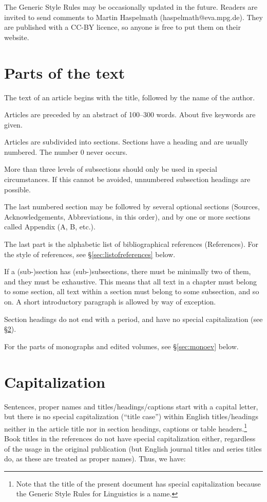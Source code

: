 \documentclass[a4paper]{article}
\newcommand{\gsrex}[1]{{\color{blue}#1}}
\newcommand{\sectref}[1]{\S\ref{#1}}
\begin{document}
The Generic Style Rules may be occasionally updated in the
future. Readers are invited to send comments to Martin Haspelmath
(haspelmath@eva.mpg.de). They are published with a CC-BY licence, so
anyone is free to put them on their website.

\section{Parts of the text}\label{sec:parts}

The text of an article begins with the title, followed by the name of
the author. 

Articles are preceded by an abstract of 100--300 words. About five keywords are given. 

Articles are subdivided into sections.
Sections have a heading and are usually numbered. The number 0 never
occurs. 

More than three levels of subsections should only be used in
special circumstances. If this cannot be avoided, unnumbered subsection
headings are possible. 

The last numbered section may be followed by
several optional sections (\gsrex{Sources},
\gsrex{Acknowledgements},
\gsrex{Abbreviations},
in this order), and by one or more sections called \gsrex{Appendix} (A, B, etc.).


The last part is the alphabetic list of bibliographical references
(\gsrex{References}). For the style of references, see \sectref{sec:listofreferences} below. 

If a
(sub-)section has (sub-)subsections, there must be minimally two of
them, and they must be exhaustive. This means that all text in a chapter
must belong to some section, all text within a section must belong to
some subsection, and so on. A short introductory paragraph is allowed by
way of exception. 

Section headings do not end with a period, and have no
special capitalization (see \sectref{sec:capitalization}). 

For the parts of monographs and edited
volumes, see \sectref{sec:monoev} below.

\section{Capitalization}\label{sec:capitalization}

Sentences, proper names and titles/headings/captions start with a
capital letter, but there is no special capitalization (``title case'')
within English titles/headings neither in the article title nor in
section headings, captions or table headers.\footnote{Note that the title
of the present document has special capitalization because the Generic
Style Rules for Linguistics is a name.} Book titles in the references
do not have special capitalization either, regardless of the usage in
the original publication (but English journal titles and series titles
do, as these are treated as proper names). Thus, we have:
\end{document}
